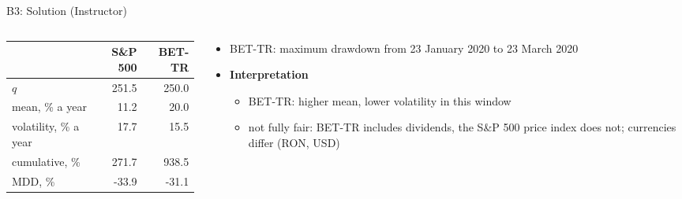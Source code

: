 \ifsolutions
\begin{frame}{B3: Solution (Instructor)}
\itemsize{\small}
\begin{columns}[T]
\begin{column}{0.45\textwidth}
\begin{center}
\footnotesize
\begin{tabular}{lrr}
\toprule
& S\&P 500 & BET-TR \\
\midrule
$q$ & 251.5 & 250.0 \\
mean, \% a year & 11.2 & 20.0 \\
volatility, \% a year & 17.7 & 15.5 \\
cumulative, \% & 271.7 & 938.5 \\
MDD, \% & -33.9 & -31.1 \\
\bottomrule
\end{tabular}
\end{center}

\end{column}
\begin{column}{0.52\textwidth}
\begin{itemize}
    \item BET-TR: maximum drawdown from 23 January 2020 to 23 March 2020
    \item \textbf{Interpretation}
    \begin{itemize}
        \item BET-TR: higher mean, lower volatility in this window
        \item not fully fair: BET-TR includes dividends, the S\&P 500 price index does not; currencies differ (RON, USD)
    \end{itemize}
\end{itemize}
\end{column}
\end{columns}
\end{frame}
\fi

